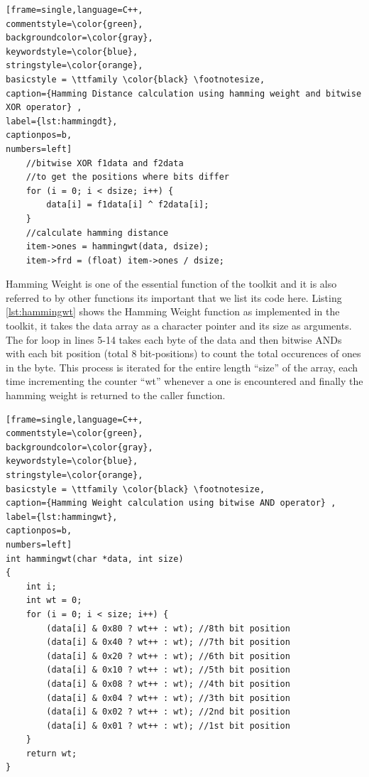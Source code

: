 \begin{center}
\begin{minipage}{0.7\textwidth}
\begin{lstlisting}[frame=single,language=C++,
commentstyle=\color{green},
backgroundcolor=\color{gray},
keywordstyle=\color{blue},
stringstyle=\color{orange},
basicstyle = \ttfamily \color{black} \footnotesize,
caption={Hamming Distance calculation using hamming weight and bitwise XOR operator} ,
label={lst:hammingdt},
captionpos=b,
numbers=left]
    //bitwise XOR f1data and f2data
    //to get the positions where bits differ
    for (i = 0; i < dsize; i++) {
        data[i] = f1data[i] ^ f2data[i];
    }
    //calculate hamming distance
    item->ones = hammingwt(data, dsize);
    item->frd = (float) item->ones / dsize;
\end{lstlisting}
\end{minipage}
\end{center}

Hamming Weight is one of the essential function of the toolkit and it is also referred to by other functions its important that we list its code here. Listing \ref{lst:hammingwt} shows the Hamming Weight function as implemented in the toolkit, it takes the data array as a character pointer and its size as arguments. The for loop in lines 5-14 takes each byte of the data and then bitwise ANDs with each bit position (total 8 bit-positions) to count the total occurences of ones in the byte. This process is
iterated for the entire length ``size'' of the array, each time incrementing the counter ``wt'' whenever a one is encountered and finally the hamming weight is returned to the caller function.\\


\begin{center}
\begin{minipage}{0.7\textwidth}
\begin{lstlisting}[frame=single,language=C++,
commentstyle=\color{green},
backgroundcolor=\color{gray},
keywordstyle=\color{blue},
stringstyle=\color{orange},
basicstyle = \ttfamily \color{black} \footnotesize,
caption={Hamming Weight calculation using bitwise AND operator} ,
label={lst:hammingwt},
captionpos=b,
numbers=left]
int hammingwt(char *data, int size)
{
    int i;
    int wt = 0;
    for (i = 0; i < size; i++) {
        (data[i] & 0x80 ? wt++ : wt); //8th bit position
        (data[i] & 0x40 ? wt++ : wt); //7th bit position
        (data[i] & 0x20 ? wt++ : wt); //6th bit position
        (data[i] & 0x10 ? wt++ : wt); //5th bit position
        (data[i] & 0x08 ? wt++ : wt); //4th bit position
        (data[i] & 0x04 ? wt++ : wt); //3th bit position
        (data[i] & 0x02 ? wt++ : wt); //2nd bit position
        (data[i] & 0x01 ? wt++ : wt); //1st bit position
    }
    return wt;
}
\end{lstlisting}
\label{hammingwt_code}
\end{minipage}
\end{center}

